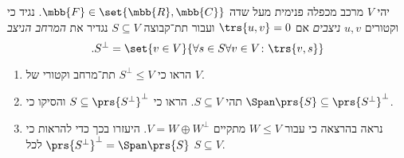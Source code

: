 \documentclass[a4paper,10pt,twoside,openany]{article}
\begin{document}
\begin{exercise}
יהי
$V$
מרכב מכפלה פנימית מעל שדה
$\mbb{F} \in \set{\mbb{R}, \mbb{C}}$.
נגיד כי וקטורים
$u,v$
\emph{ניצבים}
אם
$\trs{u,v} = 0$
ועבור תת־קבוצה
$S \subseteq V$
נגדיר את
\emph{המרחב הניצב}
\[\text{.} S^\perp = \set{v \in V}{\forall s \in S \forall v \in V \colon \trs{v,s}}\]

\begin{enumerate}
\item הראו כי
$S^\perp \leq V$
תת־מרחב וקטורי של
$V$.

\item תהי
$S \subseteq V$.
הראו כי
$S \subseteq \prs{S^{\perp}}^{\perp}$
והסיקו כי
$\Span\prs{S} \subseteq \prs{S^{\perp}}^{\perp}$.

\item
נראה בהרצאה כי עבור
$W \leq V$
מתקיים
$V = W \oplus W^\perp$.
היעזרו בכך כדי להראות כי
$\prs{S^\perp}^\perp = \Span\prs{S}$
לכל
$S \subseteq V$.
\end{enumerate}
\end{exercise}
\end{document}
